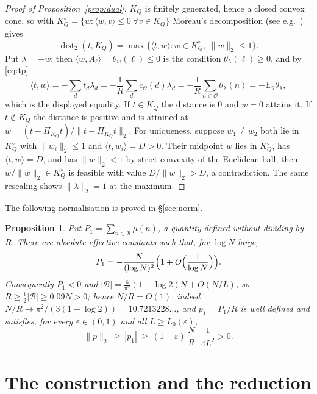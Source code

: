 \documentclass[11pt,a4paper]{article}
\theoremstyle{plain}
\newtheorem{proposition}[theorem]{Proposition}
\theoremstyle{definition}
\theoremstyle{remark}
\DeclareMathOperator{\dist}{dist}
\newcommand{\vR}{\mathcal{O}}
\newcommand{\band}{\mathcal{B}}
\newcommand{\eps}{\varepsilon}
\begin{document}
\begin{proof}[Proof of Proposition~\ref{prop:dual}]
$K_{Q}$ is finitely generated, hence a closed convex cone, so with
$K_{Q}^{\circ}=\{w:\langle w,v\rangle\le0\ \forall v\in K_{Q}\}$ Moreau's decomposition
(see e.g.\ \cite[Thm.~1.1]{Soltan}) gives
\[
  \dist_{2}(t,K_{Q})=\max\{\langle t,w\rangle:w\in K_{Q}^{\circ},\ \|w\|_{2}\le1\}.
\]
Put $\lambda=-w$; then $\langle w,A_{\ell}\rangle=\theta_{w}(\ell)\le0$ is the condition
$\theta_{\lambda}(\ell)\ge0$, and by \eqref{eq:tp}
\[
  \langle t,w\rangle=-\sum_{d}t_{d}\lambda_{d}=-\frac1R\sum_{d}c_{\vR}(d)\lambda_{d}
  =-\frac1R\sum_{n\in\vR}\theta_{\lambda}(n)=-\mathbb E_{\vR}\theta_{\lambda},
\]
which is the displayed equality. If $t\in K_{Q}$ the distance is $0$ and $w=0$ attains it. If
$t\notin K_{Q}$ the distance is positive and is attained at $w=(t-\Pi_{K_{Q}}t)/\|t-\Pi_{K_{Q}}t\|_{2}$.
For uniqueness, suppose $w_{1}\neq w_{2}$ both lie in $K_{Q}^{\circ}$ with $\|w_{i}\|_{2}\le1$ and
$\langle t,w_{i}\rangle=D>0$. Their midpoint $w$ lies in $K_{Q}^{\circ}$, has $\langle t,w\rangle=D$, and
has $\|w\|_{2}<1$ by strict convexity of the Euclidean ball; then $w/\|w\|_{2}\in K_{Q}^{\circ}$ is
feasible with value $D/\|w\|_{2}>D$, a contradiction. The same rescaling shows $\|\lambda\|_{2}=1$ at the
maximum.
\end{proof}

The following normalisation is proved in \S\ref{sec:norm}.

\begin{proposition}\label{prop:norm}
Put $P_{1}=\sum_{n\in\band}\mu(n)$, a quantity defined without dividing by $R$. There are absolute
effective constants such that, for $\log N$ large,
\[
  P_{1}=-\frac N{(\log N)^{2}}\Bigl(1+O\Bigl(\frac1{\log N}\Bigr)\Bigr).
\]
Consequently $P_{1}<0$ and $|\band|=\frac6{\pi^{2}}(1-\log2)N+O(N/L)$, so
$R\ge\frac12|\band|\ge0.09N>0$; hence $N/R=O(1)$, indeed
$N/R\to\pi^{2}/(3(1-\log2))=10.7213228\ldots$, and $p_{1}=P_{1}/R$ is well defined and satisfies, for
every $\eps\in(0,1)$ and all $L\ge L_{0}(\eps)$,
\[
  \|p\|_{2}\ \ge\ |p_{1}|\ \ge\ (1-\eps)\,\frac NR\cdot\frac1{4L^{2}}>0 .
\]
\end{proposition}

\section{The construction and the reduction}\label{sec:reduction}
\end{document}

